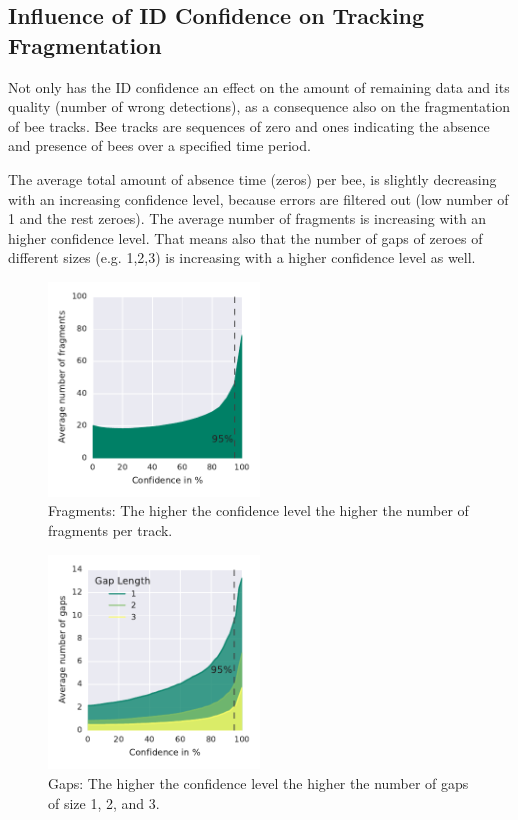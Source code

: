 \subsection{Influence of ID Confidence on Tracking Fragmentation}
\label{subsec:tracking}

Not only has the ID confidence an effect on the amount of remaining data and its quality (number of wrong detections), as a consequence also on the fragmentation of bee tracks. Bee tracks are sequences of zero and ones indicating the absence and presence of bees over a specified time period.

The average total amount of absence time (zeros) per bee, is slightly decreasing with an increasing confidence level, because errors are filtered out (low number of 1 and the rest zeroes). The average number of fragments is increasing with an higher confidence level. That means also that the number of gaps of zeroes of different sizes (e.g. 1,2,3) is increasing with a higher confidence level as well.


\begin{figure}[htb]
	\centering
	\includegraphics[width=0.5\textwidth]{Figures/fragments}
	\caption[Average Number of Fragments]{Fragments: The higher the confidence level the higher the number of fragments per track.}
	\label{fig:fragments}
\end{figure}


\begin{figure}[htb]
	\centering
	\includegraphics[width=0.5\textwidth]{Figures/gaps}
	\caption[Average Number of Gaps]{Gaps: The higher the confidence level the higher the number of gaps of size 1, 2, and 3.}
	\label{fig:gaps}
\end{figure}


